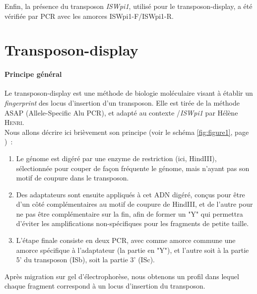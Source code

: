 
Enfin, la présence du transposon \textit{ISWpi1}, utilisé pour le transposon-display, a été vérifiée par PCR avec les amorces ISWpi1-F/ISWpi1-R.

\section{Transposon-display} %
\label{sec:transposon_display}

	\paragraph{Principe général} %
	\label{par:principe_TnDisp}
	Le transposon-display est une méthode de biologie moléculaire visant à établir un \textit{fingerprint} des locus d'insertion d'un transposon. 
	Elle est tirée de la méthode ASAP (Allele-Specific Alu PCR)\cite{ASAP}, et adapté au contexte /\textit{ISWpi1} par Hélène \textsc{Henri}\cite{memHH}.\\
	Nous allons décrire ici brièvement son principe (voir le schéma \ref{fig:figure1}, page \pageref{fig:figure1})~:
	\begin{enumerate}
		\item Le génome est digéré par une enzyme de restriction (ici, HindIII), sélectionnée pour couper de façon fréquente le génome, mais n'ayant pas son motif de coupure dans le transposon.
		\item Des adaptateurs
		sont ensuite appliqués à cet ADN digéré, conçus pour être d'un côté complémentaires au motif de coupure de HindIII, et de l'autre pour ne pas être complémentaire sur la fin, afin de former un "Y" qui permettra d'éviter les amplifications non-spécifiques pour les fragments de petite taille.
		\item L'étape finale consiste en deux PCR, avec comme amorce commune une amorce spécifique à l'adaptateur (la partie en "Y"), et l'autre soit à la partie 5' du transposon (ISb), soit la partie 3' (ISc).
	\end{enumerate}
	Après migration sur gel d'électrophorèse, nous obtenons un profil dans lequel chaque fragment correspond à un locus d'insertion du transposon.

